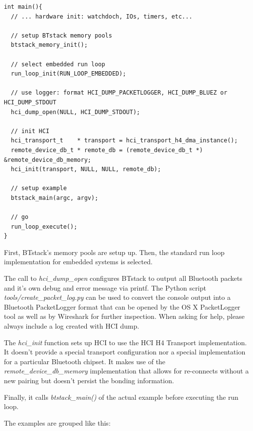 \documentclass[a4paper,titlepage,oneside,12pt]{amsart} %
\begin{document}
\begin{lstlisting}[float, caption=Exemplary platform init in main.c, label=listing:btstackInit]
int main(){
  // ... hardware init: watchdoch, IOs, timers, etc...

  // setup BTstack memory pools
  btstack_memory_init();

  // select embedded run loop
  run_loop_init(RUN_LOOP_EMBEDDED);
      
  // use logger: format HCI_DUMP_PACKETLOGGER, HCI_DUMP_BLUEZ or HCI_DUMP_STDOUT
  hci_dump_open(NULL, HCI_DUMP_STDOUT);

  // init HCI
  hci_transport_t    * transport = hci_transport_h4_dma_instance();
  remote_device_db_t * remote_db = (remote_device_db_t *) &remote_device_db_memory;
  hci_init(transport, NULL, NULL, remote_db);

  // setup example    
  btstack_main(argc, argv);

  // go
  run_loop_execute();    
}
\end{lstlisting}

First, BTstack's memory pools are setup up. Then, the standard run loop implementation for embedded systems is selected.

The call to \emph{hci\_dump\_open} configures BTstack to output all Bluetooth packets and it's own debug and error message via printf. The Python script \emph{tools/create\_packet\_log.py} can be used to convert the console output into a Bluetooth PacketLogger format that can be opened by the OS X PacketLogger tool as well as by Wireshark for further inspection. When asking for help, please always include a log created with HCI dump. 

The \emph{hci\_init} function sets up HCI to use the HCI H4 Transport implementation. It doesn't provide a special transport configuration nor a special implementation for a particular Bluetooth chipset. It makes use of the \emph{remote\_device\_db\_memory} implementation that allows for re-connects without a new pairing but doesn't persist the bonding information. 

Finally, it calls \emph{btstack\_main()} of the actual example before executing the run loop. 

The examples are grouped like this:
 

\end{document}
